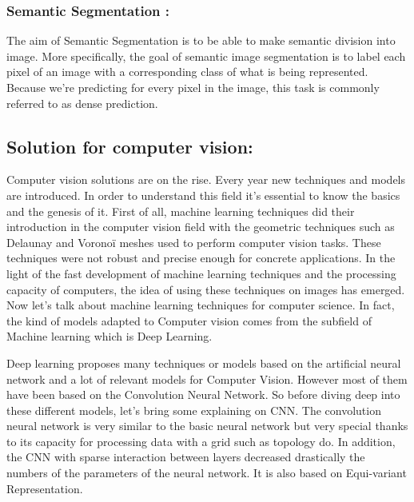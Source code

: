 \documentclass[a4paper]{article}
\begin{document}
\subsubsection{Semantic Segmentation :}
The aim of Semantic Segmentation is to be able to make semantic division into image. More specifically, the goal of semantic image segmentation is to label each pixel of an image with a corresponding class of what is being represented. Because we're predicting for every pixel in the image, this task is commonly referred to as dense prediction.

\subsection{Solution for computer vision: }
Computer vision solutions are on the rise. Every year new techniques and models are introduced. In order to understand this field it's essential to know the basics and the genesis of it.
First of all, machine learning techniques did their introduction in the computer vision field with the geometric techniques such as Delaunay and Voronoï meshes \cite{fondationvision} used to perform computer vision tasks. These techniques were not robust and precise enough for concrete applications.
In the light of the fast development of machine learning techniques and the processing capacity of computers, the idea of using these techniques on images has emerged.
Now let’s talk about machine learning techniques for computer science. In fact, the kind of models adapted to Computer vision comes from the subfield of Machine learning which is Deep Learning.

Deep learning proposes many techniques or models based on the artificial neural network and a lot of relevant models for Computer Vision. However most of them have been based on the Convolution Neural Network.
So before diving deep into these different models, let's bring some explaining on CNN.
The convolution neural network is very similar to the basic neural network but very special thanks to its capacity for processing data with a grid such as topology do. 
In addition, the CNN with sparse interaction between layers decreased drastically the numbers of the parameters of the neural network. It is also based on Equi-variant Representation.  
\end{document}
